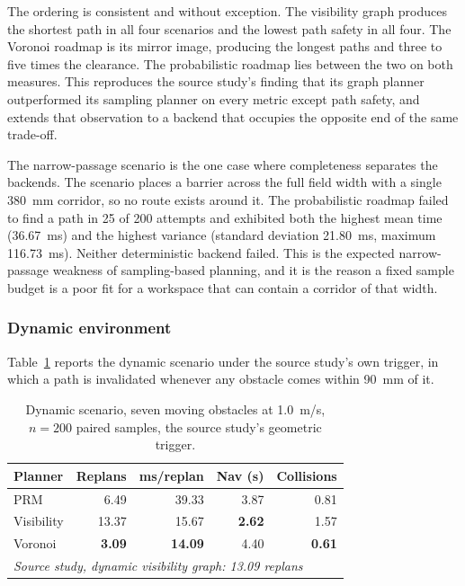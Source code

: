 The ordering is consistent and without exception. The visibility graph produces
the shortest path in all four scenarios and the lowest path safety in all four.
The Voronoi roadmap is its mirror image, producing the longest paths and three
to five times the clearance. The probabilistic roadmap lies between the two on
both measures. This reproduces the source study's finding that its graph
planner outperformed its sampling planner on every metric except path safety,
and extends that observation to a backend that occupies the opposite end of the
same trade-off.

The narrow-passage scenario is the one case where completeness separates the
backends. The scenario places a barrier across the full field width with a
single 380~mm corridor, so no route exists around it. The probabilistic roadmap
failed to find a path in 25 of 200 attempts and exhibited both the highest mean
time (36.67~ms) and the highest variance (standard deviation 21.80~ms, maximum
116.73~ms). Neither deterministic backend failed. This is the expected
narrow-passage weakness of sampling-based planning, and it is the reason a
fixed sample budget is a poor fit for a workspace that can contain a corridor
of that width.

\subsubsection{Dynamic environment}

Table~\ref{tab:dynamic} reports the dynamic scenario under the source study's
own trigger, in which a path is invalidated whenever any obstacle comes within
90~mm of it.

\begin{table}[t]
\centering
\small
\begin{tabular}{lrrrr}
\hline
Planner & Replans & ms/replan & Nav (s) & Collisions \\
\hline
PRM        & 6.49  & 39.33 & 3.87 & 0.81 \\
Visibility & 13.37 & 15.67 & \textbf{2.62} & 1.57 \\
Voronoi    & \textbf{3.09}  & \textbf{14.09} & 4.40 & \textbf{0.61} \\
\hline
\multicolumn{5}{l}{\emph{Source study, dynamic visibility graph: 13.09 replans}} \\
\hline
\end{tabular}
\caption{Dynamic scenario, seven moving obstacles at 1.0~m/s, $n=200$ paired
samples, the source study's geometric trigger.}
\label{tab:dynamic}
\end{table}

